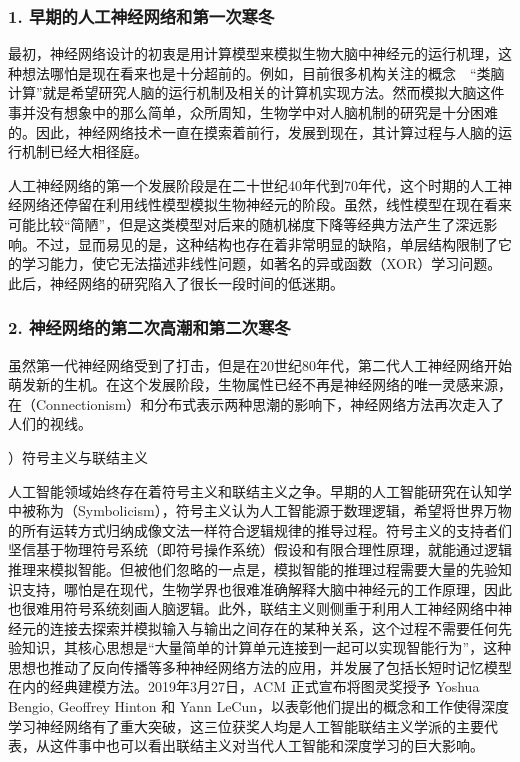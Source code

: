 \subsubsection{1. 早期的人工神经网络和第一次寒冬}

\parinterval 最初，神经网络设计的初衷是用计算模型来模拟生物大脑中神经元的运行机理，这种想法哪怕是现在看来也是十分超前的。例如，目前很多机构关注的概念\ \dash \ “类脑计算”就是希望研究人脑的运行机制及相关的计算机实现方法。然而模拟大脑这件事并没有想象中的那么简单，众所周知，生物学中对人脑机制的研究是十分困难的。因此，神经网络技术一直在摸索着前行，发展到现在，其计算过程与人脑的运行机制已经大相径庭。

\parinterval 人工神经网络的第一个发展阶段是在二十世纪40年代到70年代，这个时期的人工神经网络还停留在利用线性模型模拟生物神经元的阶段。虽然，线性模型在现在看来可能比较“简陋”，但是这类模型对后来的随机梯度下降等经典方法产生了深远影响。不过，显而易见的是，这种结构也存在着非常明显的缺陷，单层结构限制了它的学习能力，使它无法描述非线性问题，如著名的异或函数（XOR）学习问题。此后，神经网络的研究陷入了很长一段时间的低迷期。


\subsubsection{2. 神经网络的第二次高潮和第二次寒冬}

\parinterval 虽然第一代神经网络受到了打击，但是在20世纪80年代，第二代人工神经网络开始萌发新的生机。在这个发展阶段，生物属性已经不再是神经网络的唯一灵感来源，在{\small{}}（Connectionism）和分布式表示两种思潮的影响下，神经网络方法再次走入了人们的视线。

\vspace{0.3em}
）符号主义与联结主义
\vspace{0.3em}

\parinterval 人工智能领域始终存在着符号主义和联结主义之争。早期的人工智能研究在认知学中被称为{\small{}}（Symbolicism），符号主义认为人工智能源于数理逻辑，希望将世界万物的所有运转方式归纳成像文法一样符合逻辑规律的推导过程。符号主义的支持者们坚信基于物理符号系统（即符号操作系统）假设和有限合理性原理，就能通过逻辑推理来模拟智能。但被他们忽略的一点是，模拟智能的推理过程需要大量的先验知识支持，哪怕是在现代，生物学界也很难准确解释大脑中神经元的工作原理，因此也很难用符号系统刻画人脑逻辑。此外，联结主义则侧重于利用人工神经网络中神经元的连接去探索并模拟输入与输出之间存在的某种关系，这个过程不需要任何先验知识，其核心思想是“大量简单的计算单元连接到一起可以实现智能行为”，这种思想也推动了反向传播等多种神经网络方法的应用，并发展了包括长短时记忆模型在内的经典建模方法。2019年3月27日，ACM 正式宣布将图灵奖授予 Yoshua Bengio, Geoffrey Hinton 和 Yann LeCun，以表彰他们提出的概念和工作使得深度学习神经网络有了重大突破，这三位获奖人均是人工智能联结主义学派的主要代表，从这件事中也可以看出联结主义对当代人工智能和深度学习的巨大影响。

